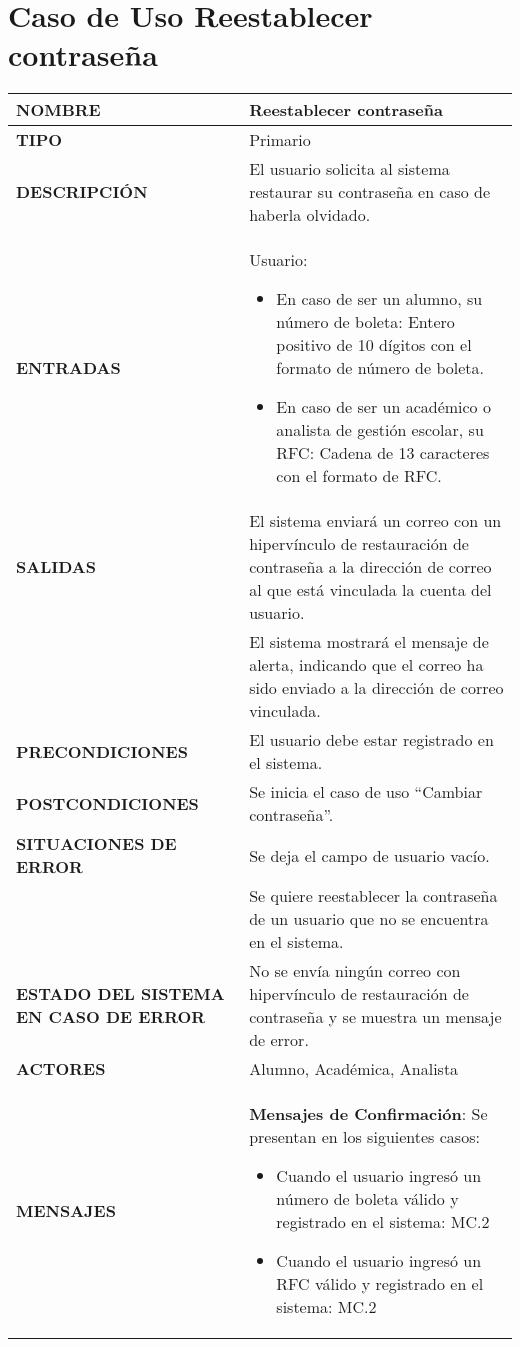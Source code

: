 \newpage
\section{Caso de Uso Reestablecer contraseña}
\begin{longtable}{ | p{6cm} | p{10cm} |}
\hline
\textbf{NOMBRE} & Reestablecer contraseña\\
\hline
\textbf{TIPO} & Primario\\
\hline
\textbf{DESCRIPCIÓN} & El usuario solicita al sistema restaurar su contraseña en caso de haberla olvidado.\\
\hline
\textbf{ENTRADAS} & Usuario: \begin{itemize}
    \item En caso de ser un alumno, su número de boleta: Entero positivo de 10 dígitos con el formato de número de boleta.
    \item En caso de ser un académico o analista de gestión escolar, su RFC: Cadena de 13 caracteres con el formato de RFC.
\end{itemize}\\
\hline
\textbf{SALIDAS} & El sistema enviará un correo con un hipervínculo de restauración de contraseña a la dirección de correo al que está vinculada la cuenta del usuario.\\ & El sistema mostrará el mensaje de alerta, indicando que el correo ha sido enviado a la dirección de correo vinculada.\\
\hline
\textbf{PRECONDICIONES} & El usuario debe estar registrado en el sistema.\\
\hline
\textbf{POSTCONDICIONES} & Se inicia el caso de uso “Cambiar contraseña”.\\
\hline
\textbf{SITUACIONES DE ERROR} & Se deja el campo de usuario vacío.\\ & Se quiere reestablecer la contraseña de un usuario que no se encuentra en el sistema.\\
\hline
\textbf{ESTADO DEL SISTEMA EN CASO DE ERROR} & No se envía ningún correo con hipervínculo de restauración de contraseña y se muestra un mensaje de error. \\
\hline
\textbf{ACTORES} & Alumno, Académica, Analista\\
\hline
\textbf{MENSAJES} & \textbf{Mensajes de Confirmación}: Se presentan en los siguientes casos: \begin{itemize}
    \item Cuando el usuario ingresó un número de boleta válido y registrado en el sistema: MC.2
    \item Cuando el usuario ingresó un RFC válido y registrado en el sistema: MC.2
\end{itemize}\\
\hline
\end{longtable}
